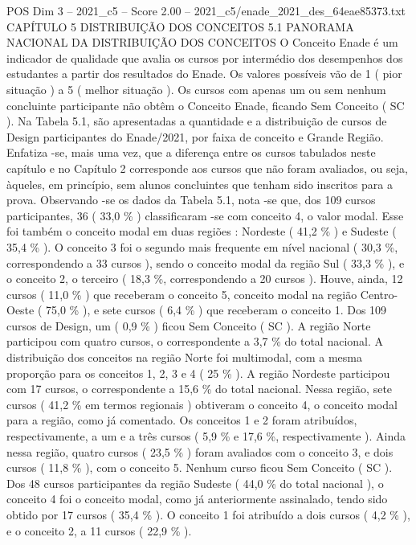 \begin{textsample}{POS Dim 3 – 2021\_c5 – Score 2.00 – 2021\_c5/enade\_2021\_des\_64eae85373.txt}  \label{ex:f3_pos_084}
CAPÍTULO 5 DISTRIBUIÇÃO DOS CONCEITOS 5.1 PANORAMA NACIONAL DA DISTRIBUIÇÃO DOS CONCEITOS O Conceito Enade é um indicador de qualidade que avalia os cursos por intermédio dos desempenhos dos estudantes a partir dos resultados do Enade.
Os valores possíveis vão de 1 ( pior situação ) a 5 ( melhor situação ).
Os cursos com apenas um ou sem nenhum concluinte participante não obtêm o Conceito Enade, ficando Sem Conceito ( SC ).
Na Tabela 5.1, são apresentadas a quantidade e a distribuição de cursos de Design participantes do Enade/2021, por faixa de conceito e Grande Região.
Enfatiza -se, mais uma vez, que a diferença entre os cursos tabulados neste capítulo e no Capítulo 2 corresponde aos cursos que não foram avaliados, ou seja, àqueles, em princípio, sem alunos concluintes que tenham sido inscritos para a prova.
Observando -se os dados da Tabela 5.1, nota -se que, dos 109 cursos participantes, 36 ( 33,0 \% ) classificaram -se com conceito 4, o valor modal.
Esse foi também o conceito modal em duas regiões : Nordeste ( 41,2 \% ) e Sudeste ( 35,4 \% ).
O conceito 3 foi o segundo mais frequente em nível nacional ( 30,3 \%, correspondendo a 33 cursos ), sendo o conceito modal da região Sul ( 33,3 \% ), e o conceito 2, o terceiro ( 18,3 \%, correspondendo a 20 cursos ).
Houve, ainda, 12 cursos ( 11,0 \% ) que receberam o conceito 5, conceito modal na região Centro-Oeste ( 75,0 \% ), e sete cursos ( 6,4 \% ) que receberam o conceito 1.
Dos 109 cursos de Design, um ( 0,9 \% ) ficou Sem Conceito ( SC ).
A região Norte participou com quatro cursos, o correspondente a 3,7 \% do total nacional.
A distribuição dos conceitos na região Norte foi multimodal, com a mesma proporção para os conceitos 1, 2, 3 e 4 ( 25 \% ).
A região Nordeste participou com 17 cursos, o correspondente a 15,6 \% do total nacional.
Nessa região, sete cursos ( 41,2 \% em termos regionais ) obtiveram o conceito 4, o conceito modal para a região, como já comentado.
Os conceitos 1 e 2 foram atribuídos, respectivamente, a um e a três cursos ( 5,9 \% e 17,6 \%, respectivamente ).
Ainda nessa região, quatro cursos ( 23,5 \% ) foram avaliados com o conceito 3, e dois cursos ( 11,8 \% ), com o conceito 5.
Nenhum curso ficou Sem Conceito ( SC ).
Dos 48 cursos participantes da região Sudeste ( 44,0 \% do total nacional ), o conceito 4 foi o conceito modal, como já anteriormente assinalado, tendo sido obtido por 17 cursos ( 35,4 \% ).
O conceito 1 foi atribuído a dois cursos ( 4,2 \% ), e o conceito 2, a 11 cursos ( 22,9 \% ).

\end{textsample}
